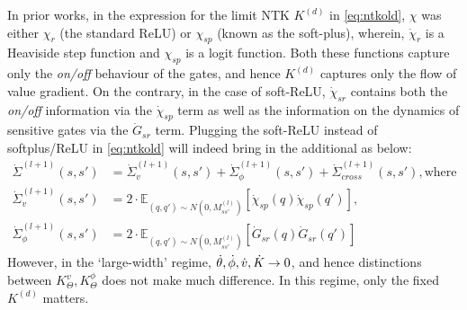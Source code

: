 In prior works, in the expression for the limit NTK $K^{(d)}$ in \eqref{eq:ntkold}, $\chi$ was either $\chi_r$ (the standard ReLU) or $\chi_{sp}$ (known as the soft-plus), wherein, $\dot{\chi}_r$ is a Heaviside step function and $\chi_{sp}$ is a logit function. Both these functions capture only the \emph{on/off} behaviour of the gates, and hence $K^{(d)}$ captures only the flow of value gradient. On the contrary, in the case of soft-ReLU, $\dot{\chi}_{sr}$ contains both the \emph{on/off} information via the $\dot{\chi}_{sp}$ term as well as the information on the dynamics of sensitive gates via the $\dot{G}_{sr}$ term. Plugging the soft-ReLU instead of softplus/ReLU in \eqref{eq:ntkold} will indeed bring in the additional as below:
\begin{align*}
\dot{\Sigma}^{(l+1)}(s,s')&=\dot{\Sigma}^{(l+1)}_v(s,s')+ \dot{\Sigma}^{(l+1)}_{\phi}(s,s') + \dot{\Sigma}^{(l+1)}_{cross}(s,s'),\text{where}\\
\dot{\Sigma}^{(l+1)}_v(s,s')&=2\cdot\mathbb{E}_{(q,q')\sim N(0,M_{ss'}^{(l)})}\left[\dot{\chi}_{sp}(q)\dot{\chi}_{sp}(q')\right],\\
\dot{\Sigma}^{(l+1)}_{\phi}(s,s')&=2\cdot\mathbb{E}_{(q,q')\sim N(0,M_{ss'}^{(l)})}\left[\dot{G}_{sr}(q)\dot{G}_{sr}(q')\right]
\end{align*}
However, in the `large-width' regime, $\dot{\theta},\dot{\phi},\dot{v},\dot{K}\rightarrow 0$, and hence distinctions between $K^{v}_{\Theta}, K^{\phi}_{\Theta}$ does not make much difference. In this regime, only the fixed $K^{(d)}$ matters.
